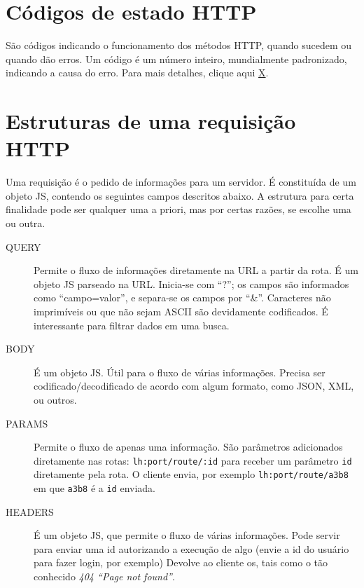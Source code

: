\documentclass[12pt,a4paper]{article}
\begin{document}
\section{Códigos de estado HTTP}
São códigos indicando o funcionamento dos métodos HTTP, quando sucedem ou quando dão erros. Um código é um número inteiro, mundialmente padronizado, indicando a causa do erro. Para mais detalhes, clique aqui \href{https://pt.wikipedia.org/wiki/Lista_de_c%C3%B3digos_de_estado_HTTP}{\color{blue}X}.



\section{Estruturas de uma requisição HTTP}
Uma requisição é o pedido de informações para um servidor.
É constituída de um objeto JS, contendo os seguintes campos
descritos abaixo. A estrutura para certa finalidade pode ser qualquer 
uma a priori, mas por certas razões, se escolhe uma ou outra.

\begin{description}
\item[QUERY] Permite o fluxo de informações diretamente na URL a partir da rota. É um objeto JS parseado na URL. Inicia-se com ``?''; os campos são informados como ``campo=valor'', e separa-se os campos por ``\&''. Caracteres não imprimíveis ou que não sejam ASCII são devidamente codificados. É interessante para filtrar dados em uma busca.

\item[BODY] É um objeto JS. Útil para o fluxo de várias informações. Precisa ser codificado/decodificado de acordo com algum formato, como JSON, XML, ou outros. 

\item[PARAMS] Permite o fluxo de apenas uma informação. São parâmetros adicionados diretamente nas rotas: \verb|lh:port/route/:id| para receber um parâmetro \verb|id| diretamente pela rota. O cliente envia, por exemplo \verb|lh:port/route/a3b8| em que \verb|a3b8| é a \verb|id| enviada.

\item[HEADERS] É um objeto JS, que permite o fluxo de várias informações. Pode servir para enviar uma id autorizando a execução de algo
(envie a id do usuário para fazer login, por exemplo)
Devolve ao cliente os, tais como o tão conhecido \emph{404 ``Page not found''}.
\end{description}
\end{document}
